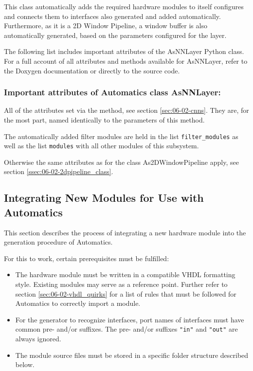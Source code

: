 This class automatically adds the required hardware modules to itself configures and connects them to interfaces also generated and added automatically.
Furthermore, as it is a 2D Window Pipeline, a window buffer is also automatically generated, based on the parameters configured for the layer.

The following list includes important attributes of the AsNNLayer Python class.
For a full account of all attributes and methods available for AsNNLayer, refer to the Doxygen documentation or directly to the source code.

\subsubsection*{Important attributes of Automatics class AsNNLayer:}

All of the attributes set via the  method, see section \ref{sec:06-02-cnns}.
They are, for the most part, named identically to the parameters of this method.

The automatically added filter modules are held in the list \texttt{filter\_modules} as well as the list \texttt{modules} with all other modules of this subsystem.

Otherwise the same attributes as for the class As2DWindowPipeline apply, see section \ref{ssec:06-02-2dpipeline_class}.


\subsection{Integrating New Modules for Use with Automatics}
\label{sec:06-02-new_modules}

This section describes the process of integrating a new \asterics hardware module into the generation procedure of Automatics.

For this to work, certain prerequisites must be fulfilled:
\begin{itemize}
\item The hardware module must be written in a compatible VHDL formatting style. Existing modules may serve as a reference point. Further refer to section \ref{sec:06-02-vhdl_quirks} for a list of rules that must be followed for Automatics to correctly import a module. 
\item For the generator to recognize interfaces, port names of interfaces must have common pre- and/or suffixes. The pre- and/or suffixes \texttt{"in"} and \texttt{"out"} are always ignored.
\item The module source files must be stored in a specific folder structure described below.
\end{itemize}

